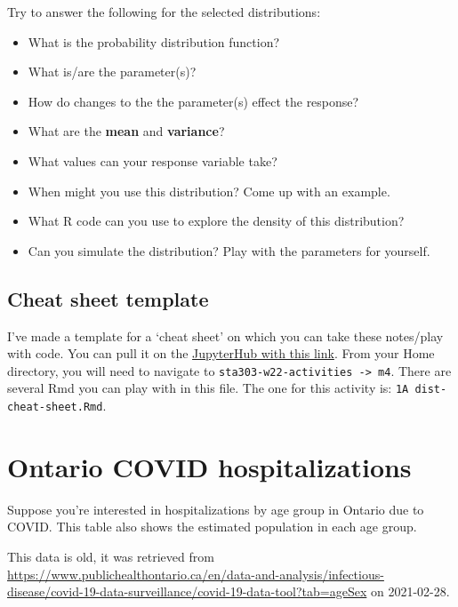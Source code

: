 \documentclass[
  openany]{book}
\providecommand{\tightlist}{%
  \setlength{\itemsep}{0pt}\setlength{\parskip}{0pt}}
\begin{document}
Try to answer the following for the selected distributions:

\begin{itemize}
\tightlist
\item
  What is the probability distribution function?
\item
  What is/are the parameter(s)?
\item
  How do changes to the the parameter(s) effect the response?
\item
  What are the \textbf{mean} and \textbf{variance}?
\item
  What values can your response variable take?
\item
  When might you use this distribution? Come up with an example.
\item
  What R code can you use to explore the density of this distribution?
\item
  Can you simulate the distribution? Play with the parameters for
  yourself.
\end{itemize}

\hypertarget{cheat-sheet-template}{%
\subsection{Cheat sheet template}\label{cheat-sheet-template}}

I've made a template for a `cheat sheet' on which you can take these
notes/play with code. You can pull it on the \href{https://jupyter.utoronto.ca/hub/user-redirect/git-pull?repo=https\%3A\%2F\%2Fgithub.com\%2Fsta303-bolton\%2Fsta303-w22-activities\&urlpath=rstudio\%2F}{JupyterHub with this
link}.
From your Home directory, you will need to navigate to
\texttt{sta303-w22-activities\ -\textgreater{}\ m4}. There are several Rmd you can play with
in this file. The one for this activity is: \texttt{1A\ dist-cheat-sheet.Rmd}.

\hypertarget{ontario-covid-hospitalizations}{%
\section{Ontario COVID hospitalizations}\label{ontario-covid-hospitalizations}}

Suppose you're interested in hospitalizations by age group in Ontario
due to COVID. This table also shows the estimated population in each age
group.

This data is old, it was retrieved from
\url{https://www.publichealthontario.ca/en/data-and-analysis/infectious-disease/covid-19-data-surveillance/covid-19-data-tool?tab=ageSex}
on 2021-02-28.
\end{document}
